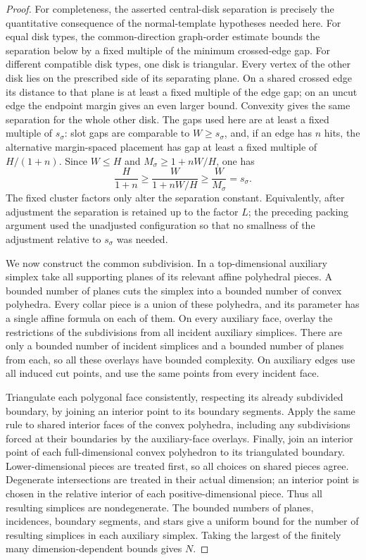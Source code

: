 \begin{proof}
For completeness, the asserted central-disk separation is precisely
the quantitative consequence of the normal-template hypotheses
needed here.  For equal disk types, the common-direction graph-order
estimate bounds the separation below by a fixed multiple of the
minimum crossed-edge gap.  For different compatible disk types, one
disk is triangular.  Every vertex of the other disk lies on the
prescribed side of its separating plane.  On a shared crossed edge
its distance to that plane is at least a fixed multiple of the edge
gap; on an uncut edge the endpoint margin gives an even larger
bound.  Convexity gives the same separation for the whole other
disk.  The gaps used here are at least a fixed multiple of
$s_\sigma$: slot gaps are comparable to $W\geq s_\sigma$, and, if an
edge has $n$ hits, the alternative margin-spaced placement has gap
at least a fixed multiple of $H/(1+n)$.  Since $W\leq H$ and
$M_\sigma\geq 1+nW/H$, one has
\[
 \frac{H}{1+n}\geq\frac{W}{1+nW/H}
 \geq\frac{W}{M_\sigma}=s_\sigma.
\]
The fixed cluster factors only alter the separation constant.
Equivalently, after adjustment the separation is retained up to the
factor $L$; the preceding packing argument used the unadjusted
configuration so that no smallness of the adjustment relative to
$s_\sigma$ was needed.

We now construct the common subdivision.  In a top-dimensional
auxiliary simplex take all supporting planes of its relevant affine
polyhedral pieces.  A bounded number of planes cuts the simplex into
a bounded number of convex polyhedra.  Every collar piece is a union
of these polyhedra, and its parameter has a single affine formula on
each of them.  On every auxiliary face, overlay the restrictions of
the subdivisions from all incident auxiliary simplices.  There are
only a bounded number of incident simplices and a bounded number of
planes from each, so all these overlays have bounded complexity.
On auxiliary edges use all induced cut points, and use the same
points from every incident face.

Triangulate each polygonal face consistently, respecting its already
subdivided boundary, by joining an interior point to its boundary
segments.  Apply the same rule to shared interior faces of the
convex polyhedra, including any subdivisions forced at their
boundaries by the auxiliary-face overlays.  Finally, join an
interior point of each full-dimensional convex polyhedron to its
triangulated boundary.  Lower-dimensional pieces are treated first,
so all choices on shared pieces agree.  Degenerate intersections
are treated in their actual dimension; an interior point is chosen
in the relative interior of each positive-dimensional piece.
Thus all resulting simplices are nondegenerate.  The bounded
numbers of planes, incidences, boundary segments, and stars give a
uniform bound for the number of resulting simplices in each
auxiliary simplex.  Taking the largest of the finitely many
dimension-dependent bounds gives $N$.
\end{proof}

